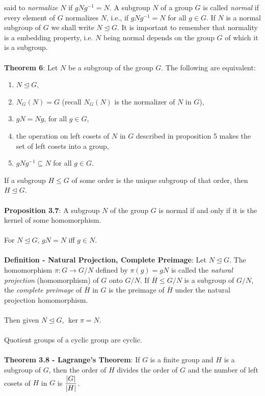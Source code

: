 \documentclass{article}
\begin{document}
said to \textit{normalize} $N$ if $gNg^{-1} = N$. A subgroup $N$ of a group $G$ is called \textit{normal} if every element of $G$ normalizes $N$, i.e., if $gNg^{-1} = N$ for all $g \in G$. If $N$ is a normal subgroup of $G$ we shall write $N \trianglelefteq G$. It is important to remember that normality is a embedding property, i.e. $N$ being normal depends on the group $G$ of which it is a subgroup. \\ \\
\textbf{Theorem 6}: Let $N$ be a subgroup of the group $G$. The following are equivalent: \begin{enumerate}
    \item $N \trianglelefteq G$,
    \item $N_G(N) = G$ (recall $N_G(N)$ is the normalizer of $N$ in $G$),
    \item $gN = Ng$, for all $g \in G$,
    \item the operation on left cosets of $N$ in $G$ described in proposition 5 makes the set of left cosets into a group,
    \item $gNg^{-1} \subseteq N$ for all $g \in G$.
\end{enumerate} $ $ \\
If a subgroup $H \leq G$ of some order is the unique subgroup of that order, then $H \trianglelefteq G$. \\ \\
\textbf{Proposition 3.7}: A subgroup $N$ of the group $G$ is normal if and only if it is the kernel of some homomorphism. \\ \\
For $N \trianglelefteq G$, $gN = N$ iff $g \in N$. \\ \\
\textbf{Definition - Natural Projection, Complete Preimage}: Let $N \trianglelefteq G$. The homomorphism $\pi: G \rightarrow G/N$ defined by $\pi(g) = gN$ is called the \textit{natural projection} (homomorphism) of $G$ onto $G/N$. If $\overline{H} \leq G/N$ is a subgroup of $G/N$, the \textit{complete preimage} of $\overline{H}$ in $G$ is the preimage of $\overline{H}$ under the natural projection homomorphism. \\ \\
Then given $N \trianglelefteq G$, $\ker{\pi} = N$. \\ \\
Quotient groups of a cyclic group are cyclic. \\ \\
\textbf{Theorem 3.8 - Lagrange's Theorem}: If $G$ is a finite group and $H$ is a subgroup of $G$, then the order of $H$ divides the order of $G$ and the number of left cosets of $H$ in $G$ is $\mathlarger{\frac{|G|}{|H|}}$. \\ \\
\end{document}

